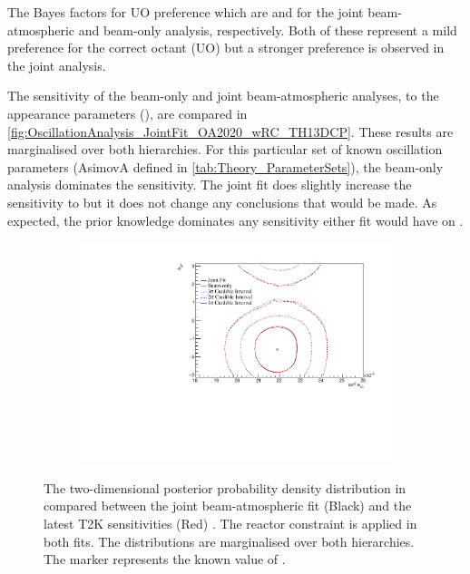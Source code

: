 The Bayes factors for UO preference which are  and  for the joint beam-atmospheric and beam-only analysis, respectively. Both of these represent a mild preference for the correct octant (UO) but a stronger preference is observed in the joint analysis.

The sensitivity of the beam-only and joint beam-atmospheric analyses, to the appearance parameters (), are compared in \autoref{fig:OscillationAnalysis_JointFit_OA2020_wRC_TH13DCP}. These results are marginalised over both hierarchies. For this particular set of known oscillation parameters (AsimovA defined in \autoref{tab:Theory_ParameterSets}), the beam-only analysis dominates the sensitivity. The joint fit does slightly increase the sensitivity to  but it does not change any conclusions that would be made. As expected, the prior knowledge dominates any sensitivity either fit would have on .

\begin{figure}[h]
  \begin{subfigure}[t]{0.98\textwidth}
    \includegraphics[width=\textwidth, trim={0mm 0mm 0mm 0mm}, clip,page=1]{Figures/OA/JointFit_OA2020_wRC_Comp/ContourComparison_2D_th13_dcp_BH_1_wRC_UnSmeared_CredibleInterval.pdf}
  \end{subfigure}
  \caption{The two-dimensional posterior probability density distribution in  compared between the joint beam-atmospheric fit (Black) and the latest T2K sensitivities (Red) \cite{Dunne2020-uf, t2k_tn_393}. The reactor constraint is applied in both fits. The distributions are marginalised over both hierarchies. The marker represents the known value of .}
  \label{fig:OscillationAnalysis_JointFit_OA2020_wRC_TH13DCP}
\end{figure}

